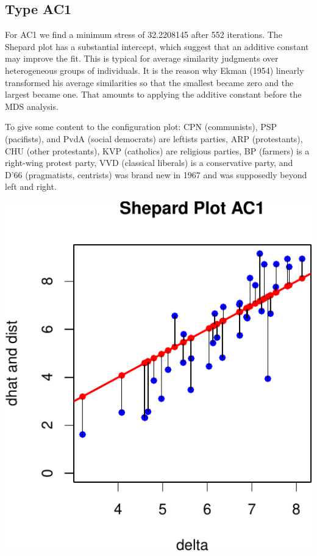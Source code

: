 \documentclass[
  12pt,
]{article}
\begin{document}
\subsection{Type AC1}\label{type-ac1-1}

For AC1 we find a minimum stress of 32.2208145 after 552 iterations.
The Shepard plot has a substantial intercept, which suggest that an additive
constant may improve the fit. This is typical for average similarity judgments
over heterogeneous groups of individuals. It is the reason why Ekman (1954)
linearly transformed his average similarities so that the smallest became zero
and the largest became one. That amounts to applying the additive constant before
the MDS analysis.

To give some content to the configuration plot: CPN (communists), PSP (pacifists),
and PvdA (social democrats) are leftists parties, ARP (protestants), CHU (other
protestants), KVP (catholics) are religious parties, BP (farmers) is a
right-wing protest party, VVD (classical liberals) is a conservative party, and D'66
(pragmatists, centrists) was brand new in 1967 and was supposedly beyond left and right.

\begin{center}\includegraphics{smacofAC_files/figure-latex/gruijterh00-1} \end{center}
\end{document}
